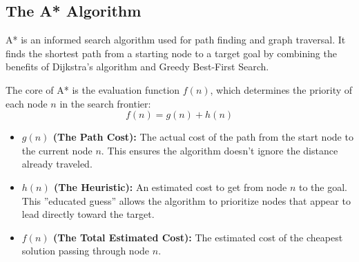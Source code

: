 \documentclass[10pt, letterpaper]{report}
\begin{document}
\subsection{The A* Algorithm}
A* is an informed search algorithm used for path finding and graph traversal. It finds the shortest path from a starting node to a target goal by combining the benefits of Dijkstra's algorithm and Greedy Best-First Search.


The core of A* is the evaluation function $f(n)$, which determines the priority of each node $n$ in the search frontier:
\[ f(n) = g(n) + h(n) \]
\begin{itemize}
    \item \textbf{$g(n)$ (The Path Cost):} The actual cost of the path from the start node to the current node $n$. This ensures the algorithm doesn't ignore the distance already traveled.
    \item \textbf{$h(n)$ (The Heuristic):} An estimated cost to get from node $n$ to the goal. This ''educated guess'' allows the algorithm to prioritize nodes that appear to lead directly toward the target.
    \item \textbf{$f(n)$ (The Total Estimated Cost):} The estimated cost of the cheapest solution passing through node $n$.
\end{itemize}
\end{document}
